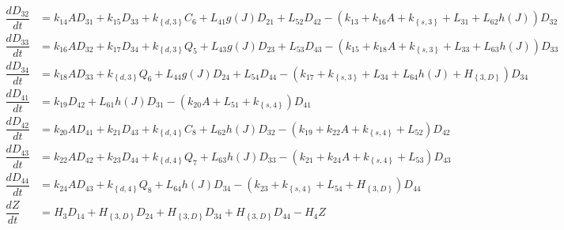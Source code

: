 \begin{align*}
\dfrac{dD_{32}}{dt} & =k_{14}AD_{31}+k_{15}D_{33}+k_\left\{d,3\right\}C_{6}+L_{41}g\left(J\right)D_{21}+L_{52}D_{42}-\left(k_{13}+k_{16}A+k_\left\{s,3\right\}+L_{31}+L_{62}h\left(J\right)\right)D_{32}\\
\dfrac{dD_{33}}{dt} & =k_{16}AD_{32}+k_{17}D_{34}+k_\left\{d,3\right\}Q_{5}+L_{43}g\left(J\right)D_{23}+L_{53}D_{43}-\left(k_{15}+k_{18}A+k_\left\{s,3\right\}+L_{33}+L_{63}h\left(J\right)\right)D_{33}\\
\dfrac{dD_{34}}{dt} & =k_{18}AD_{33}+k_\left\{d,3\right\}Q_{6}+L_{44}g\left(J\right)D_{24}+L_{54}D_{44}-\left(k_{17}+k_\left\{s,3\right\}+L_{34}+L_{64}h\left(J\right)+H_\left\{3,D\right\}\right)D_{34}\\
\dfrac{dD_{41}}{dt} & =k_{19}D_{42}+L_{61}h\left(J\right)D_{31}-\left(k_{20}A+L_{51}+k_\left\{s,4\right\}\right)D_{41}\\
\dfrac{dD_{42}}{dt} & =k_{20}AD_{41}+k_{21}D_{43}+k_\left\{d,4\right\}C_{8}+L_{62}h\left(J\right)D_{32}-\left(k_{19}+k_{22}A+k_\left\{s,4\right\}+L_{52}\right)D_{42}\\
\dfrac{dD_{43}}{dt} & =k_{22}AD_{42}+k_{23}D_{44}+k_\left\{d,4\right\}Q_{7}+L_{63}h\left(J\right)D_{33}-\left(k_{21}+k_{24}A+k_\left\{s,4\right\}+L_{53}\right)D_{43}\\
\dfrac{dD_{44}}{dt} & =k_{24}AD_{43}+k_\left\{d,4\right\}Q_{8}+L_{64}h\left(J\right)D_{34}-\left(k_{23}+k_\left\{s,4\right\}+L_{54}+H_\left\{3,D\right\}\right)D_{44}\\
\dfrac{dZ}{dt} & =H_{3}D_{14}+H_\left\{3,D\right\}D_{24}+H_\left\{3,D\right\}D_{34}+H_\left\{3,D\right\}D_{44}-H_{4}Z
\end{align*}

